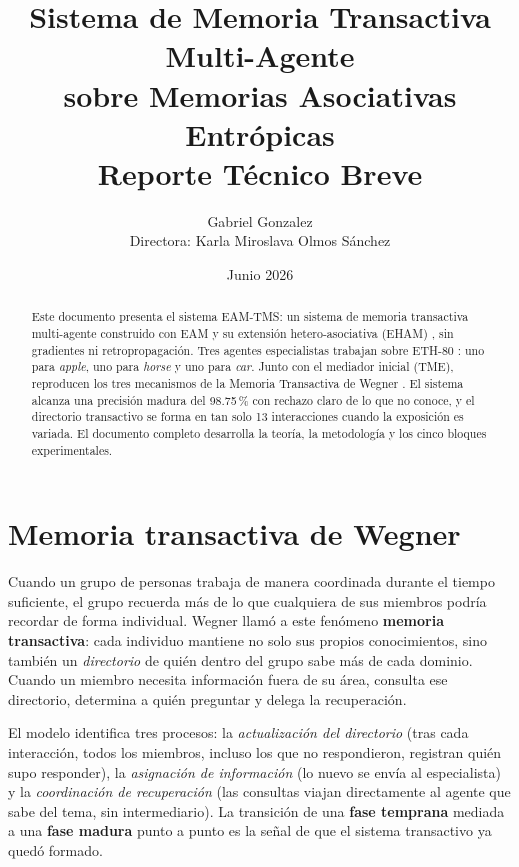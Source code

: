 \documentclass[11pt]{article}
\title{%
    \textbf{Sistema de Memoria Transactiva Multi-Agente}\\
    \textbf{sobre Memorias Asociativas Entrópicas}\\[0.4em]
    \large Reporte Técnico Breve
}
\author{Gabriel Gonzalez\\[0.3em]
\small Directora: Karla Miroslava Olmos Sánchez}
\date{Junio 2026}
\begin{document}
\maketitle

\begin{abstract}
Este documento presenta el sistema EAM-TMS: un sistema de memoria transactiva
multi-agente construido con EAM y su extensión hetero-asociativa (EHAM)
\cite{pineda2021entropic,morales2024hetero},
sin gradientes ni retropropagación.
Tres agentes especialistas trabajan sobre ETH-80 \cite{leibe2003eth80}: uno
para \textit{apple}, uno para \textit{horse} y uno para \textit{car}.
Junto con el mediador inicial (TME), reproducen los tres mecanismos de la
Memoria Transactiva de Wegner \cite{wegner1987transactive}.
El sistema alcanza una precisión madura del 98.75\,\% con rechazo claro de lo
que no conoce, y el directorio transactivo se forma en tan solo 13 interacciones
cuando la exposición es variada.
El documento completo desarrolla la teoría, la metodología y los cinco bloques
experimentales.
\end{abstract}

\section{Memoria transactiva de Wegner}

Cuando un grupo de personas trabaja de manera coordinada durante el tiempo
suficiente, el grupo recuerda más de lo que cualquiera de sus miembros podría
recordar de forma individual.
Wegner \cite{wegner1987transactive} llamó a este fenómeno \textbf{memoria
transactiva}: cada individuo mantiene no solo sus propios conocimientos, sino
también un \emph{directorio} de quién dentro del grupo sabe más de cada
dominio.
Cuando un miembro necesita información fuera de su área, consulta ese
directorio, determina a quién preguntar y delega la recuperación.

El modelo identifica tres procesos: la \emph{actualización del directorio}
(tras cada interacción, todos los miembros, incluso los que no respondieron,
registran quién supo responder), la \emph{asignación de información} (lo nuevo
se envía al especialista) y la \emph{coordinación de recuperación} (las
consultas viajan directamente al agente que sabe del tema, sin intermediario).
La transición de una \textbf{fase temprana} mediada a una \textbf{fase madura}
punto a punto es la señal de que el sistema transactivo ya quedó formado.
\end{document}
